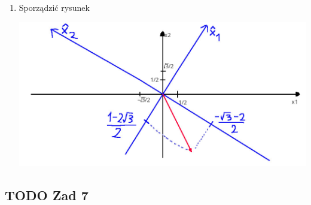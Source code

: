 \documentclass[11pt]{article}
\begin{document}
\begin{enumerate}
\item Sporządzić rysunek
\label{sec:orgb9534fa}
\begin{center}
\includegraphics[width=.9\linewidth]{img/zad6.jpg}
\end{center}
\end{enumerate}
\subsection{{\bfseries\sffamily TODO} Zad 7}
\label{sec:orgc479c6b}
\end{document}
